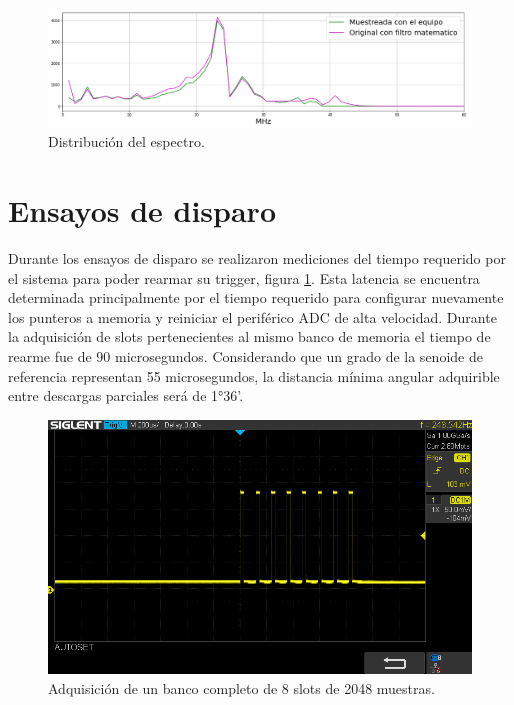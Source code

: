 \begin{figure}[ht]
	\centering
	\includegraphics[width=140mm]{./Figures/compEspectro.png}
	\caption{Distribución del espectro.}
	\label{fig:compEspectro}
\end{figure}

\newpage

\section{Ensayos de disparo}
Durante los ensayos de disparo se realizaron mediciones del tiempo requerido por el sistema para poder rearmar su trigger, figura \ref{fig:compEspectro}. Esta latencia se encuentra determinada principalmente por el tiempo requerido para configurar nuevamente los punteros a memoria y reiniciar el periférico ADC de alta velocidad. Durante la adquisición de slots pertenecientes al mismo banco de memoria el tiempo de rearme fue de 90 microsegundos. Considerando que un grado de la senoide de referencia representan 55 microsegundos, la distancia mínima angular adquirible entre descargas parciales será de 1°36’.

\vspace{5mm}

\begin{figure}[ht]
	\centering
	\includegraphics[width=140mm]{./Figures/disparos.png}
	\caption{Adquisición de un banco completo de 8 slots de 2048 muestras.}
	\label{fig:oscDisparos}
\end{figure}

